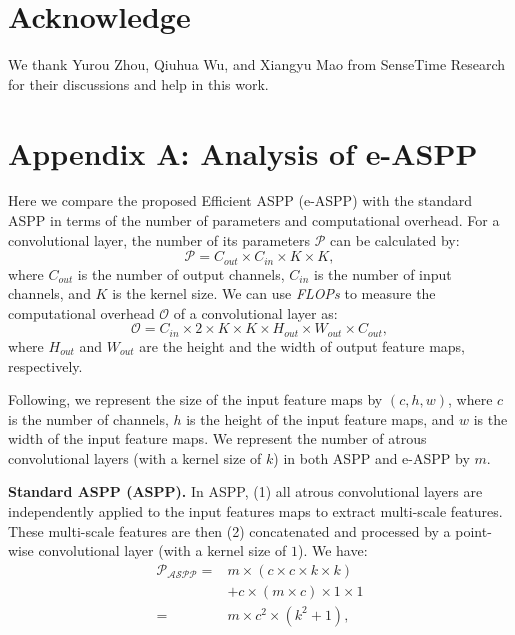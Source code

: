 \documentclass[letterpaper]{article} \usepackage{aaai22}  \usepackage{times}  \usepackage{helvet}  \usepackage{courier}  \usepackage[hyphens]{url}  \usepackage{graphicx} \urlstyle{rm} \def\UrlFont{\rm}  \usepackage{natbib}  \usepackage{caption} \usepackage{booktabs}
\begin{document}
\section{Acknowledge}
We thank Yurou Zhou, Qiuhua Wu, and Xiangyu Mao from SenseTime Research for their discussions and help in this work.







\section*{Appendix A: Analysis of e-ASPP}
Here we compare the proposed Efficient ASPP (e-ASPP) with the standard ASPP in terms of the number of parameters and computational overhead. For a convolutional layer, the number of its parameters $\mathcal{P}$ can be calculated by:
\begin{equation}
    \mathcal{P} = C_{out} \times C_{in} \times K \times K,
\end{equation}
where $C_{out}$ is the number of output channels, $C_{in}$ is the number of input channels, and $K$ is the kernel size. We can use {\it FLOPs} to measure the computational overhead $\mathcal{O}$ of a convolutional layer as:
\begin{equation}
    \mathcal{O} = C_{in} \times 2 \times K \times K \times H_{out} \times W_{out} \times C_{out},
\end{equation}
where $H_{out}$ and $W_{out}$ are the height and the width of output feature maps, respectively.

Following, we represent the size of the input feature maps by $(c, h, w)$, where $c$ is the number of channels, $h$ is the height of the input feature maps, and $w$ is the width of the input feature maps. We represent the number of atrous convolutional layers (with a kernel size of $k$) in both ASPP and e-ASPP by $m$.


\textbf{Standard ASPP (ASPP).} In ASPP, (1) all atrous convolutional layers are independently applied to the input features maps to extract multi-scale features. These multi-scale features are then (2) concatenated and processed by a point-wise convolutional layer (with a kernel size of $1$). We have:
\begin{equation}
\begin{split}
        \mathcal{P_{ASPP}} =& m \times (c \times c \times k \times k) \\ &+ c \times (m \times c) \times 1 \times 1 \\
    =& m \times c^2 \times (k^2 + 1), \\
\end{split}
\end{equation}
\end{document}
